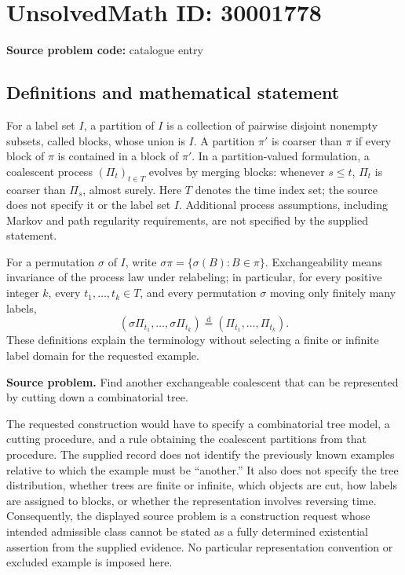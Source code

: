 \documentclass[11pt]{article}
\begin{document}
\section*{UnsolvedMath ID: 30001778}
\textbf{Source problem code:} catalogue entry
\subsection{Definitions and mathematical statement}
For a label set \(I\), a partition of \(I\) is a collection of pairwise disjoint nonempty subsets, called blocks, whose union is \(I\). A partition \(\pi'\) is coarser than \(\pi\) if every block of \(\pi\) is contained in a block of \(\pi'\). In a partition-valued formulation, a coalescent process \((\Pi_t)_{t\in T}\) evolves by merging blocks: whenever \(s\leq t\), \(\Pi_t\) is coarser than \(\Pi_s\), almost surely. Here \(T\) denotes the time index set; the source does not specify it or the label set \(I\). Additional process assumptions, including Markov and path regularity requirements, are not specified by the supplied statement.

For a permutation \(\sigma\) of \(I\), write \(\sigma\pi=\{\sigma(B):B\in\pi\}\). Exchangeability means invariance of the process law under relabeling; in particular, for every positive integer \(k\), every \(t_1,\ldots,t_k\in T\), and every permutation \(\sigma\) moving only finitely many labels,
\[
 (\sigma\Pi_{t_1},\ldots,\sigma\Pi_{t_k})
 \overset{\mathrm d}{=}
 (\Pi_{t_1},\ldots,\Pi_{t_k}).
\]
These definitions explain the terminology without selecting a finite or infinite label domain for the requested example.

\textbf{Source problem.} Find another exchangeable coalescent that can be represented by cutting down a combinatorial tree.

The requested construction would have to specify a combinatorial tree model, a cutting procedure, and a rule obtaining the coalescent partitions from that procedure. The supplied record does not identify the previously known examples relative to which the example must be ``another.'' It also does not specify the tree distribution, whether trees are finite or infinite, which objects are cut, how labels are assigned to blocks, or whether the representation involves reversing time. Consequently, the displayed source problem is a construction request whose intended admissible class cannot be stated as a fully determined existential assertion from the supplied evidence. No particular representation convention or excluded example is imposed here.
\end{document}
